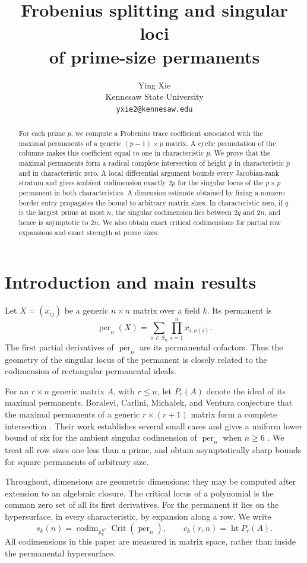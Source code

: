 \documentclass[11pt]{article}
\title{Frobenius splitting and singular loci\\of prime-size permanents}
\author{Ying Xie\\Kennesaw State University\\\texttt{yxie2@kennesaw.edu}}
\date{}
\theoremstyle{definition}\newtheorem{definition}[theorem]{Definition}
\theoremstyle{remark}\newtheorem{remark}[theorem]{Remark}
\DeclareMathOperator{\per}{per}
\DeclareMathOperator{\Crit}{Crit}
\DeclareMathOperator{\codim}{codim}
\DeclareMathOperator{\htop}{ht}
\newcommand{\A}{\mathbb A}
\numberwithin{equation}{section}
\begin{document}
\maketitle
\begin{abstract}
For each prime $p$, we compute a Frobenius trace coefficient associated
with the maximal permanents of a generic $(p-1)\times p$ matrix.
A cyclic permutation of the columns makes this coefficient equal to
one in characteristic $p$. We prove that the maximal permanents form
a radical complete intersection of height $p$ in characteristic $p$
and in characteristic zero. A local differential argument bounds every
Jacobian-rank stratum and gives ambient codimension exactly $2p$ for
the singular locus of the $p\times p$ permanent in both
characteristics. A dimension estimate obtained by fixing a nonzero
border entry propagates the bound to arbitrary matrix sizes. In
characteristic zero, if $q$ is the largest prime at most $n$, the
singular codimension lies between $2q$ and $2n$, and hence is
asymptotic to $2n$. We also obtain exact critical codimensions for
partial row expansions and exact strength at prime sizes.
\end{abstract}

\section{Introduction and main results}
Let $X=(x_{ij})$ be a generic $n\times n$ matrix over a field $k$.
Its permanent is
\[
 \per_n(X)=\sum_{\sigma\in S_n}\prod_{i=1}^n x_{i,\sigma(i)}.
\]
The first partial derivatives of $\per_n$ are its permanental
cofactors. Thus the geometry of the singular locus of the permanent
is closely related to the codimension of rectangular permanental
ideals.

For an $r\times n$ generic matrix $A$, with $r\le n$, let $P_r(A)$
denote the ideal of its maximal permanents. Boralevi, Carlini,
Micha\l{}ek, and Ventura conjecture that the maximal permanents of
a generic $r\times(r+1)$ matrix form a complete intersection
\cite[Conjecture~3.4]{BCMV}. Their work establishes several small
cases and gives a uniform lower bound of six for the ambient singular
codimension of $\per_n$ when $n\ge6$
\cite[Theorem~4.23]{BCMV}. We treat all row sizes one less than a
prime, and obtain asymptotically sharp bounds for square permanents
of arbitrary size.

Throughout, dimensions are geometric dimensions: they may be
computed after extension to an algebraic closure. The critical locus
of a polynomial is the common zero set of all its first derivatives.
For the permanent it lies on the hypersurface, in every
characteristic, by expansion along a row. We write
\[
 s_k(n)=\codim_{\A^{n^2}_k}\Crit(\per_n),\qquad
 c_k(r,n)=\htop P_r(A).
\]
All codimensions in this paper are measured in matrix space, rather
than inside the permanental hypersurface.
\end{document}
